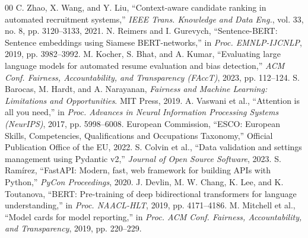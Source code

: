 \documentclass[conference]{IEEEtran}
\begin{document}
\begin{thebibliography}{00}
 C. Zhao, X. Wang, and Y. Liu, ``Context-aware candidate ranking in automated recruitment systems,'' \textit{IEEE Trans. Knowledge and Data Eng.}, vol. 33, no. 8, pp. 3120--3133, 2021.
 N. Reimers and I. Gurevych, ``Sentence-BERT: Sentence embeddings using Siamese BERT-networks,'' in \textit{Proc. EMNLP-IJCNLP}, 2019, pp. 3982--3992.
 M. Kocher, S. Bhat, and A. Kumar, ``Evaluating large language models for automated resume evaluation and bias detection,'' \textit{ACM Conf. Fairness, Accountability, and Transparency (FAccT)}, 2023, pp. 112--124.
 S. Barocas, M. Hardt, and A. Narayanan, \textit{Fairness and Machine Learning: Limitations and Opportunities}. MIT Press, 2019.
 A. Vaswani et al., ``Attention is all you need,'' in \textit{Proc. Advances in Neural Information Processing Systems (NeurIPS)}, 2017, pp. 5998--6008.
 European Commission, ``ESCO: European Skills, Competencies, Qualifications and Occupations Taxonomy,'' Official Publication Office of the EU, 2022.
 S. Colvin et al., ``Data validation and settings management using Pydantic v2,'' \textit{Journal of Open Source Software}, 2023.
 S. Ramírez, ``FastAPI: Modern, fast, web framework for building APIs with Python,'' \textit{PyCon Proceedings}, 2020.
 J. Devlin, M. W. Chang, K. Lee, and K. Toutanova, ``BERT: Pre-training of deep bidirectional transformers for language understanding,'' in \textit{Proc. NAACL-HLT}, 2019, pp. 4171--4186.
 M. Mitchell et al., ``Model cards for model reporting,'' in \textit{Proc. ACM Conf. Fairness, Accountability, and Transparency}, 2019, pp. 220--229.
\end{thebibliography}
\end{document}
